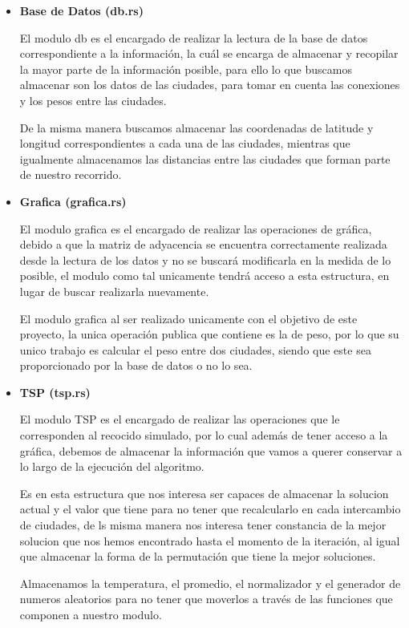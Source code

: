 \begin{multicols}{2}
 \begin{itemize}

 \item \textbf{Base de Datos (db.rs)}
   
 El modulo db es el encargado de realizar la lectura de la base de datos correspondiente a la información, la cuál se encarga de almacenar y recopilar la mayor parte de la información posible, para ello lo que buscamos almacenar son los datos de las ciudades, para tomar en cuenta las conexiones y los pesos entre las ciudades.

 De la misma manera buscamos almacenar las coordenadas de latitude y longitud correspondientes a cada una de las ciudades, mientras que igualmente almacenamos las distancias entre las ciudades que forman parte de nuestro recorrido.

\item \textbf{Grafica (grafica.rs)}

  El modulo grafica es el encargado de realizar las operaciones de gráfica, debido a que la matriz de adyacencia se encuentra correctamente realizada desde la lectura de los datos y no se buscará modificarla en la medida de lo posible, el modulo como tal unicamente tendrá acceso a esta estructura, en lugar de buscar realizarla nuevamente.

  El modulo grafica al ser realizado unicamente con el objetivo de este proyecto, la unica operación publica que contiene es la de peso, por lo que su unico trabajo es calcular el peso entre dos ciudades, siendo que este sea proporcionado por la base de datos o no lo sea. 
  
\item \textbf{TSP (tsp.rs)}

  El modulo TSP es el encargado de realizar las operaciones que le corresponden al recocido simulado, por lo cual además de tener acceso a la gráfica, debemos de almacenar la información que vamos a querer conservar a lo largo de la ejecución del algoritmo.

  Es en esta estructura que nos interesa ser capaces de almacenar la solucion actual y el valor que tiene para no tener que recalcularlo en cada intercambio de ciudades, de ls misma manera nos interesa tener constancia de la mejor solucion que nos hemos encontrado hasta el momento de la iteración, al igual que almacenar la forma de la permutación que tiene la mejor soluciones.

  Almacenamos la temperatura, el promedio, el normalizador y el generador de numeros aleatorios para no tener que moverlos a través de las funciones que componen a nuestro modulo.


\end{itemize}
\end{multicols}
